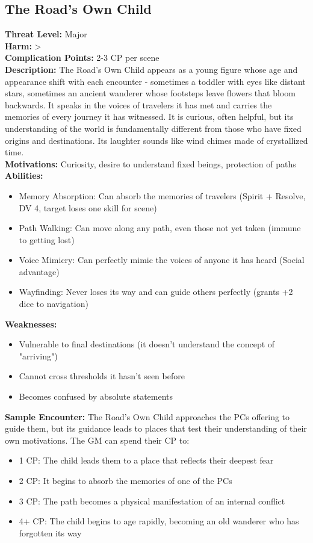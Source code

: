 \documentclass[11pt]{article}
\newenvironment{monsterentry}[1]{%
  \begin{mdframed}[backgroundcolor=shadecolor, linewidth=0pt, leftmargin=0pt, rightmargin=0pt]%
  \subsection*{#1}%
}{%
  \end{mdframed}%
}
\begin{document}
\begin{monsterentry}{The Road's Own Child}
\textbf{Threat Level:} Major \\
\textbf{Harm:} \textgreater \\
\textbf{Complication Points:} 2-3 CP per scene \\
\textbf{Description:} The Road's Own Child appears as a young figure whose age and appearance shift with each encounter - sometimes a toddler with eyes like distant stars, sometimes an ancient wanderer whose footsteps leave flowers that bloom backwards. It speaks in the voices of travelers it has met and carries the memories of every journey it has witnessed. It is curious, often helpful, but its understanding of the world is fundamentally different from those who have fixed origins and destinations. Its laughter sounds like wind chimes made of crystallized time. \\
\textbf{Motivations:} Curiosity, desire to understand fixed beings, protection of paths \\
\textbf{Abilities:}
\begin{itemize}
    \item Memory Absorption: Can absorb the memories of travelers (Spirit + Resolve, DV 4, target loses one skill for scene)
    \item Path Walking: Can move along any path, even those not yet taken (immune to getting lost)
    \item Voice Mimicry: Can perfectly mimic the voices of anyone it has heard (Social advantage)
    \item Wayfinding: Never loses its way and can guide others perfectly (grants +2 dice to navigation)
\end{itemize}
\textbf{Weaknesses:}
\begin{itemize}
    \item Vulnerable to final destinations (it doesn't understand the concept of "arriving")
    \item Cannot cross thresholds it hasn't seen before
    \item Becomes confused by absolute statements
\end{itemize}
\textbf{Sample Encounter:} The Road's Own Child approaches the PCs offering to guide them, but its guidance leads to places that test their understanding of their own motivations. The GM can spend their CP to:
\begin{itemize}
    \item 1 CP: The child leads them to a place that reflects their deepest fear
    \item 2 CP: It begins to absorb the memories of one of the PCs
    \item 3 CP: The path becomes a physical manifestation of an internal conflict
    \item 4+ CP: The child begins to age rapidly, becoming an old wanderer who has forgotten its way
\end{itemize}
\end{monsterentry}
\end{document}
